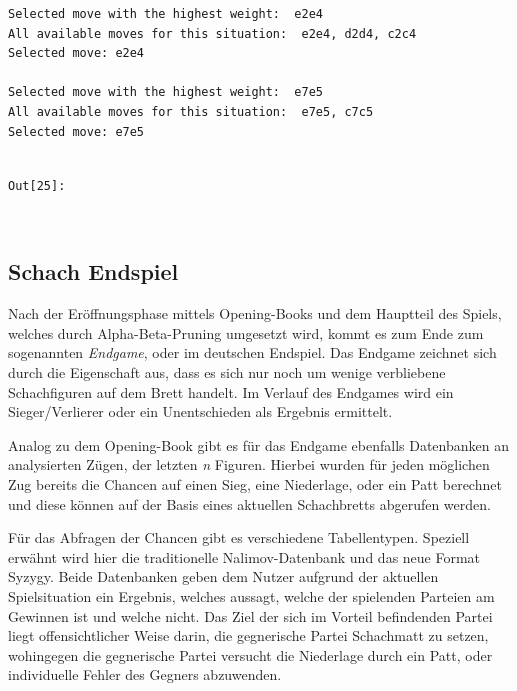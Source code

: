     \begin{Verbatim}[commandchars=\\\{\}]
Selected move with the highest weight:  e2e4
All available moves for this situation:  e2e4, d2d4, c2c4
Selected move: e2e4

Selected move with the highest weight:  e7e5
All available moves for this situation:  e7e5, c7c5
Selected move: e7e5


    \end{Verbatim}
\texttt{\color{outcolor}Out[{\color{outcolor}25}]:}
    
    \begin{center}
    \end{center}
    { \hspace*{\fill} \\}
    

    \subsection{Schach Endspiel}\label{chess-endgame}

Nach der Eröffnungsphase mittels Opening-Books und dem Hauptteil des
Spiels, welches durch Alpha-Beta-Pruning umgesetzt wird, kommt es zum
Ende zum sogenannten \emph{Endgame}, oder im deutschen Endspiel. Das
Endgame zeichnet sich durch die Eigenschaft aus, dass es sich nur noch
um wenige verbliebene Schachfiguren auf dem Brett handelt. Im Verlauf
des Endgames wird ein Sieger/Verlierer oder ein Unentschieden als
Ergebnis ermittelt.

Analog zu dem Opening-Book gibt es für das Endgame ebenfalls Datenbanken
an analysierten Zügen, der letzten \emph{n} Figuren. Hierbei wurden für
jeden möglichen Zug bereits die Chancen auf einen Sieg, eine Niederlage,
oder ein Patt berechnet und diese können auf der Basis eines aktuellen
Schachbretts abgerufen werden.

Für das Abfragen der Chancen gibt es verschiedene Tabellentypen.
Speziell erwähnt wird hier die traditionelle Nalimov-Datenbank\cite{Chessprogramming.org2019} und das
neue Format Syzygy\cite{Chessprogramming.org2019a}. Beide Datenbanken geben dem Nutzer aufgrund der
aktuellen Spielsituation ein Ergebnis, welches aussagt, welche der
spielenden Parteien am Gewinnen ist und welche nicht. Das Ziel der sich
im Vorteil befindenden Partei liegt offensichtlicher Weise darin, die
gegnerische Partei Schachmatt zu setzen, wohingegen die gegnerische
Partei versucht die Niederlage durch ein Patt, oder individuelle Fehler
des Gegners abzuwenden.

